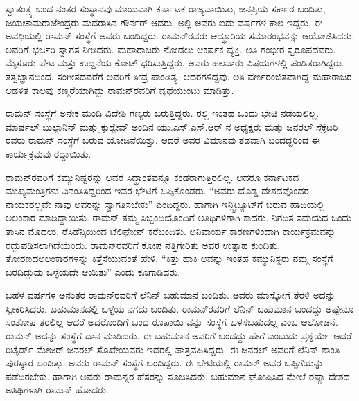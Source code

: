 ಸ್ವಾತಂತ್ರ್ಯ ಬಂದ ನಂತರ ಸಂಸ್ಥಾನವು ಮಾಯವಾಗಿ ಕರ್ನಾಟಕ ರಾಜ್ಯವಾಯಿತು, ಜನಪ್ರಿಯ ಸರ್ಕಾರ ಬಂದಿತು, ಜಯಚಾಮರಾಜೇಂದ್ರರು ಮದರಾಸಿನ ಗೌರ್ನರ್ ಆದರು. ಅಲ್ಲಿ ಅವರು ಐದು ವರ್ಷಗಳ ಕಾಲ ಇದ್ದರು. ಈ ಅವಧಿಯಲ್ಲಿ ರಾಮನ್ ಸಂಸ್ಥೆಗೆ ಅವರು ಬಂದಿದ್ದರು. ರಾಮನ್‍ರವರು ಆದ್ಧೂರಿಯ ಸಮಾರಂಭವನ್ನು ಆಯೋಜಿಸಿದರು. ಅವರಿಗೆ ಭರ್ಜರಿ ಸ್ವಾಗತ ನೀಡಿದರು. ಮಹಾರಾಜರು ನೋಡಲು ಆಕರ್ಷಕ ವ್ಯಕ್ತಿ. ಅತಿ ಗಂಭೀರ ಸ್ವರೂಪದವರು. ಮೈಸೂರು ಪೇಟ ಮತ್ತು ಉದ್ದನೆಯ ಕೋಟ್ ಧರಿಸುತ್ತಿದ್ದರು. ಅವರು ಹಲವಾರು ವಿಷಯಗಳಲ್ಲಿ ಪಂಡಿತರಾಗಿದ್ದರು. ತತ್ವಜ್ಞಾನದಿಂದ, ಸಂಗೀತದವರೆಗೆ ಅವರಿಗೆ ತೀವ್ರ ಪಾಂಡಿತ್ಯ, ಆದರಗಳಿದ್ದವು. ಅತಿ ವರ್ಣರಂಜಿತವಾಗಿದ್ದ ಮಹಾರಾಜರ ಆಡಳಿತ ಕಾಲವು ಕಣ್ಮರೆಯಾಗಿದ್ದು ರಾಮನ್‍ರವರಿಗೆ ವ್ಯಥೆಯುಂಟು ಮಾಡಿತ್ತು.



ರಾಮನ್ ಸಂಸ್ಥೆಗೆ ಅನೇಕ ಮಂದಿ ವಿದೇಶಿ ಗಣ್ಯರು ಬರುತ್ತಿದ್ದರು. ರಲ್ಲಿ ಇಂತಹ ಒಂದು ಭೇಟಿ ನಡೆಯಲಿಲ್ಲ. ಮಾರ್ಷಲ್ ಬುಲ್ಗಾನಿನ್ ಮತ್ತು ಕ್ರುಶ್ವೇವ್ ಅಂದಿನ ಯು.ಎಸ್.ಎಸ್.ಆರ್ ನ ಅಧ್ಯಕ್ಷರು ಮತ್ತು ಜನರಲ್ ಸೆಕ್ರೆಟರಿ ರವರು ರಾಮನ್ ಸಂಸ್ಥೆಗೆ ಬರುವ ಯೋಜನೆಯಿತ್ತು. ಆದರೆ ಅವರ ವಿಮಾನವು ತಡವಾಗಿ ಬಂದದ್ದರಿಂದ ಈ ಕಾರ್ಯಕ್ರಮವು ರದ್ದಾಯಿತು.

ರಾಮನ್‍ರವರಿಗೆ ಕಮ್ಯುನಿಷ್ಟರನ್ನು ಅವರ ಸಿದ್ಧಾಂತವನ್ನೂ ಕಂಡರಾಗುತ್ತಿರಲಿಲ್ಲ. ಆದರೂ ಕರ್ನಾಟಕದ ಮುಖ್ಯಮಂತ್ರಿಗಳು ವಿನಂತಿಸಿದ್ದರಿಂದ ಇವರ ಭೇಟಿಗೆ ಒಪ್ಪಿಕೊಂಡರು. “ಅವರು ದೊಡ್ಡ ದೇಶದವೊಂದರ ನಾಯಕರಲ್ಲವೇ ನಾವು ಅವರನ್ನು ಸ್ವಾಗತಿಸಬೇಕು” ಎಂದಿದ್ದರು. ಹಾಗಾಗಿ ಇನ್ಸ್ಟಿಟ್ಯೂಟ್‍ಗೆ ಬರುವ ಹಾದಿಯಲ್ಲಿ ಅಲಂಕಾರ ಮಾಡಿದ್ದಾಯಿತು. ರಾಮನ್ ತಮ್ಮ ಸಿಬ್ಬಂದಿಯೊಂದಿಗೆ ಅತಿಥಿಗಳಿಗಾಗಿ ಕಾದರು. ನಿಗದಿತ ಸಮಯದ ಒಂದು ತಾಸಿನ ಮೊದಲು, ರೆಸಿಡೆನ್ಸಿಯಿಂದ ಟೆಲಿಫೋನ್ ಕರೆಬಂದಿತು. ಅನಿವಾರ್ಯ ಕಾರಣಗಳಿಂದಾಗಿ ಕಾರ್ಯಕ್ರಮವನ್ನು ರದ್ದುಪಡಿಸಲಾಗಿದೆಯೆಂದು. ರಾಮನ್‍ರವರಿಗೆ ಕೋಪ ನೆತ್ತಿಗೇರಿತು ಅವರ ಉತ್ಸಾಹ ಕುಂದಿತು. ತೋರಣದ\break ಅಲಂಕಾರಗಳನ್ನು ಕಿತ್ತೆಸೆಯುವಂತೆ ಹೇಳಿ, “ಕಿತ್ತು ಹಾಕಿ ಅವನ್ನು ಇಂತಹ ಕಮ್ಯುನಿಸ್ಟರು ನಮ್ಮ ಸಂಸ್ಥೆಗೆ ಬರದಿದ್ದುದು ಒಳ್ಳೆಯದೇ ಆಯಿತು” ಎಂದು ಕೂಗಾಡಿದರು.

ಬಹಳ ವರ್ಷಗಳ ಅನಂತರ ರಾಮನ್‍ರವರಿಗೆ ಲೆನಿನ್ ಬಹುಮಾನ ಬಂದಿತು. ಅವರು ಮಾಸ್ಕೋಗೆ ತೆರಳಿ ಅದನ್ನು ಸ್ವೀಕರಿಸಿದರು. ಬಹುಮಾನದಲ್ಲಿ ಒಳ್ಳೆಯ ನಗದು ಬಂದಿತು. ರಾಮನ್‍ರವರಿಗೆ ಲೆನಿನ್ ಬಹುಮಾನ ಬಂದದ್ದು ಅಷ್ಟೇನೂ ಸಂತೋಷ ತರಲಿಲ್ಲ ಆದರೆ ಅದರೊಂದಿಗೆ ಬಂದ ರೂಪಾಯಿ  ವನ್ನು ಸಂಸ್ಥೆಗೆ ಬಳಸಬಹುದಲ್ಲ ಎಂಬ ಆಲೋಚನೆ. ರಾಮನ್ ಅದನ್ನು ಸಂಸ್ಥೆಗೆ ದಾನ ಮಾಡಿದರು. ಈ ಬಹುಮಾನ ಅವರಿಗೆ ಬಂದದ್ದು ಹೇಗೆ ಎಂಬುದು ಪ್ರಶ್ನೆಯೇ. ಆದರೆ ರಿಟೈರ್ಡ್ ಮೇಜರ್ ಜನರಲ್ ಸೊಖೇಯವರು ಇದರಲ್ಲಿ ಪಾತ್ರವಹಿಸಿದ್ದರು. ಈ ಜನರಲ್ ಅವರಿಗೆ ಲೆನಿನ್ ಶಾಂತಿ ಪುರಸ್ಕಾರ ಬಂದಿತ್ತು. ಅವರು ರಾಮನ್ ಸಂಸ್ಥೆಗೆ ಬಂದಿದ್ದರು. ಈ ಭೇಟಿಯಲ್ಲಿ ರಾಮನ್ ಅವರ ಒಪ್ಪಿಗೆಯನ್ನು ಪಡೆದಿರಬೇಕು. ಹಾಗಾಗಿ ಅವರು ರಾಮನ್ನರ ಹೆಸರನ್ನು ಸೂಚಿಸಿದರು. ಬಹುಮಾನ ಘೋಷಿಸಿದ ಮೇಲೆ ರಷ್ಯಾ ದೇಶದ ಅತಿಥಿಗಳಾಗಿ ರಾಮನ್ ಹೋದರು.

